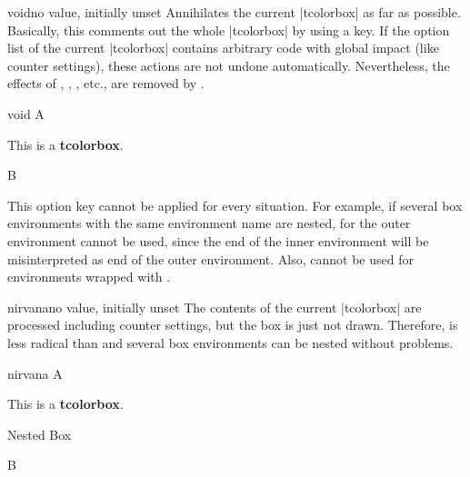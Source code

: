 \clearpage
\begin{docTcbKey}[][doc new=2016-10-21]{void}{}{no value, initially unset}
  Annihilates the current |tcolorbox| as far as possible.
  Basically, this comments out the whole |tcolorbox| by using a key.
  If the option list of the current |tcolorbox| contains arbitrary code with global
  impact (like counter settings), these actions are not undone automatically.
  Nevertheless, the effects of , ,
  , etc., are removed by .

\begin{exdispExample}{void}
A%
  \begin{tcolorbox}[
      title=This box is completely removed by the following key,
      void
    ]
  This is a \textbf{tcolorbox}.
  \end{tcolorbox}
B
\end{exdispExample}

\begin{marker}
  This option key cannot be applied for every situation.
  For example, if several box environments with the same environment name
  are nested, for the outer environment  cannot be used,
  since the end of the inner environment will be misinterpreted as
  end of the outer environment. Also,  cannot be used
  for environments wrapped with .
\end{marker}
\end{docTcbKey}


\begin{docTcbKey}[][doc new=2019-03-01]{nirvana}{}{no value, initially unset}
  The contents of the current |tcolorbox| are processed including counter
  settings, but the box is just not drawn.
  Therefore,  is less radical than 
  and several box environments can be nested without problems.

\begin{exdispExample}{nirvana}
A%
  \begin{tcolorbox}[
      title=This box is completely removed by the following key,
      nirvana
    ]
  This is a \textbf{tcolorbox}.
    \begin{tcolorbox}
    Nested Box
    \end{tcolorbox}
  \end{tcolorbox}%
B
\end{exdispExample}
\end{docTcbKey}
